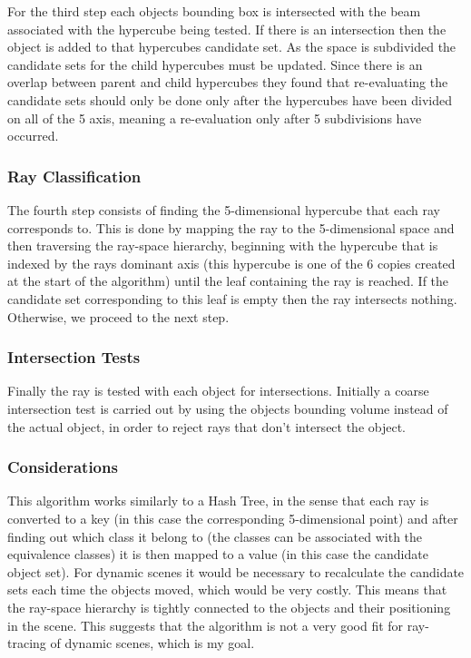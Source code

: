 For the third step each objects bounding box is intersected with the beam associated with the hypercube being tested. If there is an intersection then the object is added to that hypercubes candidate set. As the space is subdivided the candidate sets for the child hypercubes must be updated. Since there is an overlap between parent and child hypercubes they found that re-evaluating the candidate sets should only be done only after the hypercubes have been divided on all of the 5 axis, meaning a re-evaluation only after 5 subdivisions have occurred.

\subsubsection{Ray Classification}

The fourth step consists of finding the 5-dimensional hypercube that each ray corresponds to. This is done by mapping the ray to the 5-dimensional space and then traversing the ray-space hierarchy, beginning with the hypercube that is indexed by the rays dominant axis (this hypercube is one of the 6 copies created at the start of the algorithm) until the leaf containing the ray is reached. If the candidate set corresponding to this leaf is empty then the ray intersects nothing. Otherwise, we proceed to the next step.

\subsubsection{Intersection Tests}	

Finally the ray is tested with each object for intersections. Initially a coarse intersection test is carried out by using the objects bounding volume instead of the actual object, in order to reject rays that don't intersect the object.

\subsubsection{Considerations}

This algorithm works similarly to a Hash Tree, in the sense that each ray is converted to a key (in this case the corresponding 5-dimensional point) and after finding out which class it belong to (the classes can be associated with the equivalence classes) it is then mapped to a value (in this case the candidate object set). For dynamic scenes it would be necessary to recalculate the candidate sets each time the objects moved, which would be very costly. This means that the ray-space hierarchy is tightly connected to the objects and their positioning in the scene. This suggests that the algorithm is not a very good fit for ray-tracing of dynamic scenes, which is my goal.


